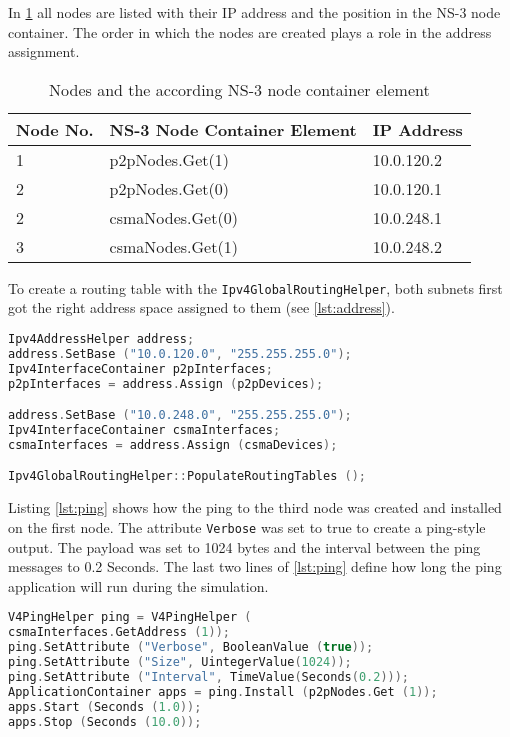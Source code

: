 \documentclass[parskip=full]{scrartcl}
\begin{document}
In \cref{tab:Nodes} all nodes are listed with their IP address and the position in the NS-3 node container. 
The order in which the nodes are created plays a role in the address assignment.
\begin{table}[hb]
	\centering
	\begin{tabular}{lll}
		\toprule
		\textbf{Node No.} & \textbf{NS-3 Node Container Element} & \textbf{IP Address}\\ \midrule
		1 & p2pNodes.Get(1) & 10.0.120.2 \\
		2 & p2pNodes.Get(0) & 10.0.120.1 \\
		2 & csmaNodes.Get(0) & 10.0.248.1 \\
		3 & csmaNodes.Get(1) & 10.0.248.2 \\
		\bottomrule
	\end{tabular}
	\caption{Nodes and the according NS-3 node container element}
	\label{tab:Nodes}
\end{table}
\clearpage

To create a routing table with the \verb|Ipv4GlobalRoutingHelper|, both subnets first got the right address space assigned to them (see \cref{lst:address}).

\begin{lstlisting}[language=c++, frame=single, captionpos=b, caption={IP address assignment and routing table creation}, label=lst:address]
Ipv4AddressHelper address;
address.SetBase ("10.0.120.0", "255.255.255.0");
Ipv4InterfaceContainer p2pInterfaces;
p2pInterfaces = address.Assign (p2pDevices);

address.SetBase ("10.0.248.0", "255.255.255.0");
Ipv4InterfaceContainer csmaInterfaces;
csmaInterfaces = address.Assign (csmaDevices);

Ipv4GlobalRoutingHelper::PopulateRoutingTables ();
\end{lstlisting}

Listing \ref{lst:ping} shows how the ping to the third node was created and installed on the first node. 
The attribute \verb|Verbose| was set to true to create a ping-style output. 
The payload was set to 1024 bytes and the interval between the ping messages to 0.2 Seconds.
The last two lines of \cref{lst:ping} define how long the ping application will run during the simulation.

\begin{lstlisting}[language=c++, frame=single , captionpos=b, caption={Ping set-up},label=lst:ping]
V4PingHelper ping = V4PingHelper (
csmaInterfaces.GetAddress (1));
ping.SetAttribute ("Verbose", BooleanValue (true));
ping.SetAttribute ("Size", UintegerValue(1024));
ping.SetAttribute ("Interval", TimeValue(Seconds(0.2)));
ApplicationContainer apps = ping.Install (p2pNodes.Get (1));
apps.Start (Seconds (1.0));
apps.Stop (Seconds (10.0));
\end{lstlisting}
\end{document}
